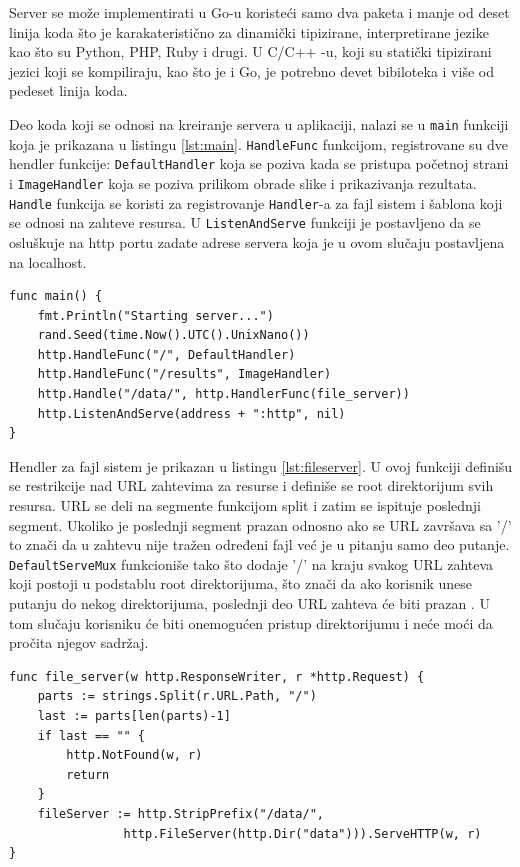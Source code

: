 \documentclass[12pt,oneside]{memoir}
\begin{document}
Server se može implementirati u Go-u  koristeći samo dva paketa i manje od deset linija koda što je karakateristično za dinamički tipizirane, interpretirane jezike kao što su Python, PHP, Ruby i drugi. U C/C++ -u, koji su statički tipizirani jezici koji se kompiliraju, kao što je i Go, je potrebno devet bibiloteka i više od pedeset linija koda.\cite{server}

Deo koda koji se odnosi na kreiranje servera u aplikaciji, nalazi se u \texttt{main} funkciji koja je prikazana u listingu \ref{lst:main}. \texttt{HandleFunc} funkcijom, registrovane su dve hendler funkcije: \texttt{DefaultHandler} koja se poziva kada se pristupa početnoj strani i \texttt{ImageHandler} koja se poziva prilikom obrade slike i prikazivanja rezultata. \texttt{Handle} funkcija se koristi za registrovanje \texttt{Handler}-a za fajl sistem i šablona koji se odnosi na zahteve resursa.  U \texttt{ListenAndServe} funkciji je postavljeno da se osluškuje na http portu zadate adrese servera koja je u ovom slučaju postavljena na localhost.

\begin{center}
\begin{lstlisting}[caption={Funkcija \texttt{main}, kreiranje servera},label={lst:main},  backgroundcolor=\color{background},belowskip=-0.7 \baselineskip ]
func main() {
	fmt.Println("Starting server...")
	rand.Seed(time.Now().UTC().UnixNano())
	http.HandleFunc("/", DefaultHandler)
	http.HandleFunc("/results", ImageHandler)
	http.Handle("/data/", http.HandlerFunc(file_server))
	http.ListenAndServe(address + ":http", nil)
}
\end{lstlisting}
\end{center}

\label{fileserver}Hendler za fajl sistem je prikazan u listingu \ref{lst:fileserver}. U ovoj funkciji definišu se restrikcije nad URL zahtevima za resurse i definiše se root direktorijum svih resursa. URL se deli na segmente funkcijom split i zatim se ispituje poslednji segment. Ukoliko je poslednji segment prazan odnosno ako se URL završava sa '/' to znači da u zahtevu nije tražen određeni fajl već je u pitanju samo deo putanje. \texttt{DefaultServeMux} funkcioniše tako što dodaje '/' na kraju svakog URL zahteva koji postoji u podstablu root direktorijuma, što znači da ako korisnik unese putanju do nekog direktorijuma, poslednji deo URL zahteva će biti prazan \cite{http}. U tom slučaju korisniku će biti onemogućen pristup direktorijumu i neće moći da pročita njegov sadržaj.

\begin{center}
\begin{lstlisting}[caption=Hendler za fajl sistem,label={lst:fileserver},  backgroundcolor=\color{background}]
func file_server(w http.ResponseWriter, r *http.Request) {
	parts := strings.Split(r.URL.Path, "/")
	last := parts[len(parts)-1]
	if last == "" {
		http.NotFound(w, r)
		return
	}
	fileServer := http.StripPrefix("/data/", 
				http.FileServer(http.Dir("data"))).ServeHTTP(w, r)
}
\end{lstlisting}
\end{center}
\end{document}
